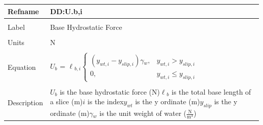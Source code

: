 \documentclass[12pt]{article}
\begin{document}
\noindent \begin{minipage}{\textwidth}
\begin{tabular}{p{} p{}}
\toprule \textbf{Refname} & \textbf{DD:U.b,i}
\label{DD:U.b,i}
\\ \midrule \\
Label & Base Hydrostatic Force
\\ \midrule \\
Units & N
\\ \midrule \\
Equation & ${U_{b}}$ = ${\ell{}_{b,i}} \begin{cases}
\left({y_{wt,i}}-{y_{slip,i}}\right) {\gamma{}_{w}}, & {y_{wt,i}}>{y_{slip,i}}\\
0, & {y_{wt,i}}\leq{}{y_{slip,i}}
\end{cases}$
\\ \midrule \\
Description & ${U_{b}}$ is the base hydrostatic force (N)\newline${\ell{}_{b}}$ is the total base length of a slice (m)\newline$i$ is the index\newline${y_{wt}}$ is the y ordinate (m)\newline${y_{slip}}$ is the y ordinate (m)\newline${\gamma{}_{w}}$ is the unit weight of water ($\frac{\text{N}}{\text{m}^{3}}$)
\\ \bottomrule \end{tabular}
\end{minipage}\\
~\newline
\end{document}
